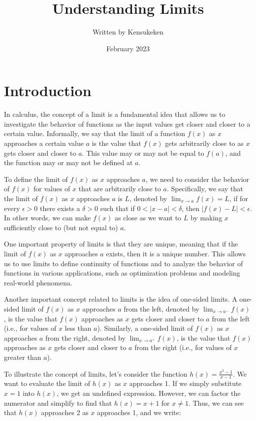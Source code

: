 \documentclass{article}
\title{Understanding Limits}
\author{Written by Kensukeken}
\date{February 2023}
\begin{document}
\maketitle

\section{Introduction}
In calculus, the concept of a limit is a fundamental idea that allows us to investigate the behavior of functions as the input values get closer and closer to a certain value. Informally, we say that the limit of a function $f(x)$ as $x$ approaches a certain value $a$ is the value that $f(x)$ gets arbitrarily close to as $x$ gets closer and closer to $a$. This value may or may not be equal to $f(a)$, and the function may or may not be defined at $a$.

To define the limit of $f(x)$ as $x$ approaches $a$, we need to consider the behavior of $f(x)$ for values of $x$ that are arbitrarily close to $a$. Specifically, we say that the limit of $f(x)$ as $x$ approaches $a$ is $L$, denoted by $\lim_{x\to a} f(x) = L$, if for every $\epsilon > 0$ there exists a $\delta > 0$ such that if $0 < |x - a| < \delta$, then $|f(x) - L| < \epsilon$. In other words, we can make $f(x)$ as close as we want to $L$ by making $x$ sufficiently close to (but not equal to) $a$.

One important property of limits is that they are unique, meaning that if the limit of $f(x)$ as $x$ approaches $a$ exists, then it is a unique number. This allows us to use limits to define continuity of functions and to analyze the behavior of functions in various applications, such as optimization problems and modeling real-world phenomena.

Another important concept related to limits is the idea of one-sided limits. A one-sided limit of $f(x)$ as $x$ approaches $a$ from the left, denoted by $\lim_{x\to a^-} f(x)$, is the value that $f(x)$ approaches as $x$ gets closer and closer to $a$ from the left (i.e., for values of $x$ less than $a$). Similarly, a one-sided limit of $f(x)$ as $x$ approaches $a$ from the right, denoted by $\lim_{x\to a^+} f(x)$, is the value that $f(x)$ approaches as $x$ gets closer and closer to $a$ from the right (i.e., for values of $x$ greater than $a$).

To illustrate the concept of limits, let's consider the function $h(x) = \frac{x^2 - 1}{x - 1}$. We want to evaluate the limit of $h(x)$ as $x$ approaches 1. If we simply substitute $x=1$ into $h(x)$, we get an undefined expression. However, we can factor the numerator and simplify to find that $h(x) = x + 1$ for $x\neq 1$. Thus, we can see that $h(x)$ approaches 2 as $x$ approaches 1, and we write:
\end{document}
